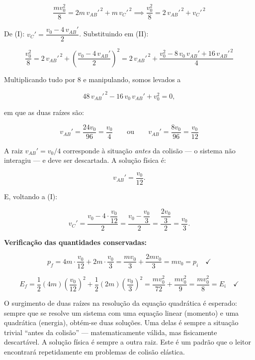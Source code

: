 \begin{exemplo}
\[
    \frac{mv_0^2}{8}
    = 2m\,v_{AB}'^{\,2} + m\,v_C'^{\,2}
    \implies
    \frac{v_0^2}{8} = 2\,v_{AB}'^{\,2} + v_C'^{\,2}
    \tag{II}
\]


\medskip
\noindent De (I): $v_C' = \dfrac{v_0 - 4\,v_{AB}'}{2}$.
Substituindo em (II):

\[
    \frac{v_0^2}{8}
    = 2\,v_{AB}'^{\,2}
    + \left(\frac{v_0 - 4\,v_{AB}'}{2}\right)^{\!2}
    = 2\,v_{AB}'^{\,2}
    + \frac{v_0^2 - 8\,v_0\,v_{AB}' + 16\,v_{AB}'^{\,2}}{4}
\]

\noindent Multiplicando tudo por 8 e manipulando, somos levados a 

\[
  48\,v_{AB}'^{\,2} - 16\,v_0\,v_{AB}' + v_0^2 =0,
\]

\noindent em que as duas raízes são:

\[
    v_{AB}' = \frac{24v_0}{96} = \frac{v_0}{4}
    \qquad\text{ou}\qquad
    v_{AB}' = \frac{8v_0}{96} = \frac{v_0}{12}
\]

\noindent A raiz $v_{AB}' = v_0/4$ corresponde à situação
\textit{antes} da colisão — o sistema não interagiu — e deve
ser descartada. A solução física é:

\[
    \boxed{v_{AB}' = \frac{v_0}{12}}.
\]

\noindent E, voltando a (I):

\[
    v_C' = \frac{v_0 - 4\cdot\dfrac{v_0}{12}}{2}
         = \frac{v_0 - \dfrac{v_0}{3}}{2}
         = \frac{\dfrac{2v_0}{3}}{2}
         = \boxed{\frac{v_0}{3}.}
\]

\medskip
\noindent\textbf{Verificação das quantidades conservadas:}

\[
    p_f = 4m\cdot\frac{v_0}{12} + 2m\cdot\frac{v_0}{3}
        = \frac{mv_0}{3} + \frac{2mv_0}{3} = mv_0 = p_i
    \quad\checkmark
\]

\[
    E_f = \frac{1}{2}(4m)\!\left(\frac{v_0}{12}\right)^{\!2}
        + \frac{1}{2}(2m)\!\left(\frac{v_0}{3}\right)^{\!2}
        = \frac{mv_0^2}{72} + \frac{mv_0^2}{9}
        = \frac{mv_0^2}{8} = E_i
    \quad\checkmark
\]

\medskip
O surgimento de duas raízes na resolução da equação quadrática
é esperado: sempre que se resolve um sistema com uma equação
linear (momento) e uma quadrática (energia), obtém-se duas
soluções. Uma delas é sempre a situação trivial
``antes da colisão'' — matematicamente válida, mas fisicamente
descartável. A solução física é sempre a outra raiz.
Este é um padrão que o leitor encontrará repetidamente em
problemas de colisão elástica.



\end{exemplo}



